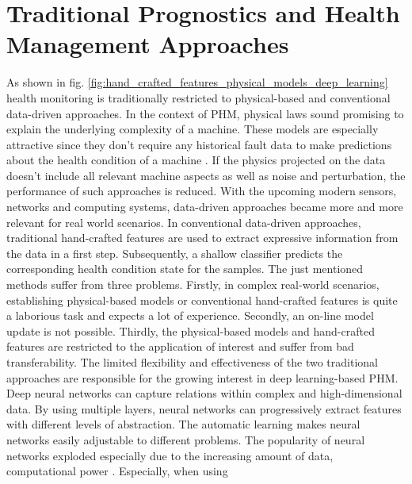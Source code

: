 \section{Traditional Prognostics and Health Management Approaches}
As shown in fig. \ref{fig:hand_crafted_features_physical_models_deep_learning} health monitoring is traditionally restricted to physical-based and conventional data-driven approaches. In the context of PHM, physical laws sound promising to explain the underlying complexity of a machine. These models are especially attractive since they don't require any historical fault data to make predictions about the health condition of a machine \cite{AN201942}. If the physics projected on the data doesn't include all relevant machine aspects as well as noise and perturbation, the performance of such approaches is reduced. With the upcoming modern sensors, networks and computing systems, data-driven approaches became more and more relevant for real world scenarios. In conventional data-driven approaches, traditional hand-crafted features are used to extract expressive information from the data in a first step. Subsequently, a shallow classifier predicts the corresponding health condition state for the samples. The just mentioned methods suffer from three problems. Firstly, in complex real-world scenarios, establishing physical-based models or conventional hand-crafted features is quite a laborious task and expects a lot of experience. Secondly, an on-line model update is not possible. Thirdly, the physical-based models and hand-crafted features are restricted to the application of interest and suffer from bad transferability. The limited flexibility and effectiveness of the two traditional approaches are responsible for the growing interest in deep learning-based PHM. Deep neural networks can capture relations within complex and high-dimensional data. By using multiple layers, neural networks can progressively extract features with different levels of abstraction. The automatic learning makes neural networks easily adjustable to different problems. The popularity of neural networks exploded especially due to the increasing amount of data, computational power \cite{ZHAO2019213} \cite{AZAMFAR2020103932}. Especially, when using 

